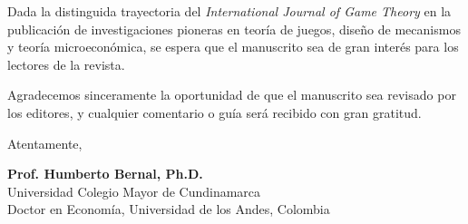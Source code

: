 \documentclass[12pt]{article}
\begin{document}
Dada la distinguida trayectoria del \textit{International Journal of Game Theory} en la publicación de investigaciones pioneras en teoría de juegos, diseño de mecanismos y teoría microeconómica, se espera que el manuscrito sea de gran interés para los lectores de la revista.

Agradecemos sinceramente la oportunidad de que el manuscrito sea revisado por los editores, y cualquier comentario o guía será recibido con gran gratitud.

\vspace{2.5em}

\begin{flushleft}
Atentamente,

\vspace{2.5em}

\textbf{Prof. Humberto Bernal, Ph.D.} \\
Universidad Colegio Mayor de Cundinamarca \\
Doctor en Economía, Universidad de los Andes, Colombia
\end{flushleft}
\end{document}
